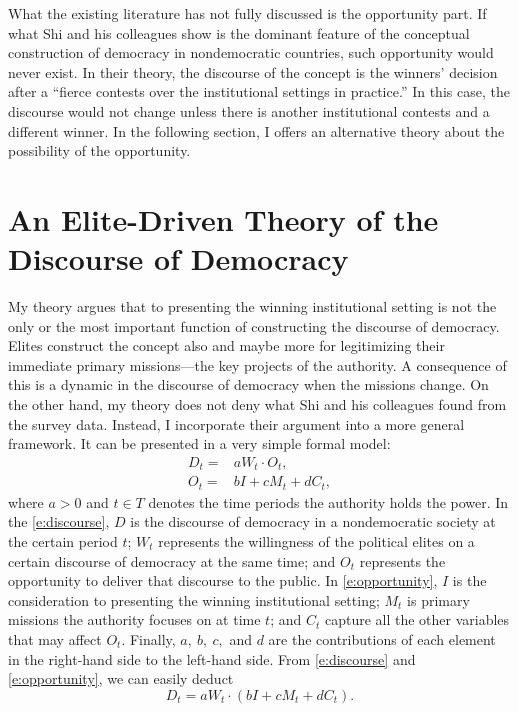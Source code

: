 \documentclass[abstracton,UTF8]{ctexart}
\begin{document}
What the existing literature has not fully discussed is the opportunity part. If what Shi and his colleagues show is the dominant feature of the conceptual construction of democracy in nondemocratic countries, such opportunity would never exist. In their theory, the discourse of the concept is the winners' decision after a ``fierce contests over the institutional settings in practice.'' In this case, the discourse would not change unless there is another institutional contests and a different winner. In the following section, I offers an alternative theory about the possibility of the opportunity.



\section{An Elite-Driven Theory of the Discourse of Democracy}\label{s:theory}
My theory argues that to presenting the winning institutional setting is not the only or the most important function of constructing the discourse of democracy. Elites construct the concept also and maybe more for legitimizing their immediate primary missions---the key projects of the authority. A consequence of this is a dynamic in the discourse of democracy when the missions change. On the other hand, my theory does not deny what Shi and his colleagues found from the survey data. Instead, I incorporate their argument into a more general framework. It can be presented in a very simple formal model:
\begin{align}
D_t =& aW_t\cdot O_t, \label{e:discourse}\\
O_t =& bI + cM_t + dC_t, \label{e:opportunity}
\end{align} where $a > 0$ and $t \in T$ denotes the time periods the authority holds the power. In the \cref{e:discourse}, $ D $ is the discourse of democracy in a nondemocratic society at the certain period $t$; $ W_t$ represents the willingness of the political elites on a certain discourse of democracy at the same time; and $ O_t $ represents the opportunity to deliver that discourse to the public. In \cref{e:opportunity}, $ I $ is the consideration to presenting the winning institutional setting; $ M_t $ is primary missions the authority focuses on at time $t$; and $C_t$ capture all the other variables that may affect $ O_t $. Finally, $a,\ b,\ c,$ and $d$ are the contributions of each element in the right-hand side to the left-hand side. From \cref{e:discourse} and \cref{e:opportunity}, we can easily deduct 
\begin{equation}
D_t = aW_t\cdot (bI + cM_t + dC_t). \label{e:full}
\end{equation}
\end{document}
